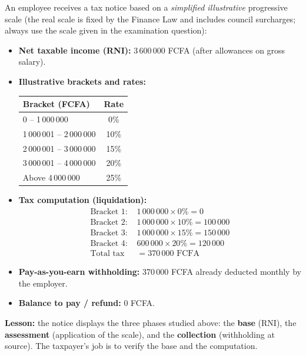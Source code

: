 \documentclass[11pt]{article}
\begin{document}
\begin{experience}
An employee receives a tax notice based on a \emph{simplified illustrative} progressive scale (the real scale is fixed by the Finance Law and includes council surcharges; always use the scale given in the examination question):
\begin{itemize}
    \item \textbf{Net taxable income (RNI):} 3\,600\,000 FCFA (after allowances on gross salary).
    \item \textbf{Illustrative brackets and rates:}
    \begin{center}
    \begin{tabular}{|l|c|}
    \hline
    \rowcolor{popblueL}
    \textbf{Bracket (FCFA)} & \textbf{Rate} \\
    \hline
    0 -- 1\,000\,000 & 0\% \\
    \hline
    1\,000\,001 -- 2\,000\,000 & 10\% \\
    \hline
    2\,000\,001 -- 3\,000\,000 & 15\% \\
    \hline
    3\,000\,001 -- 4\,000\,000 & 20\% \\
    \hline
    Above 4\,000\,000 & 25\% \\
    \hline
    \end{tabular}
    \end{center}
    \item \textbf{Tax computation (liquidation):}
    \begin{align*}
        \text{Bracket 1: } & 1\,000\,000 \times 0\% = 0 \\
        \text{Bracket 2: } & 1\,000\,000 \times 10\% = 100\,000 \\
        \text{Bracket 3: } & 1\,000\,000 \times 15\% = 150\,000 \\
        \text{Bracket 4: } & 600\,000 \times 20\% = 120\,000 \\
        \text{Total tax} & = 370\,000 \text{ FCFA}
    \end{align*}
    \item \textbf{Pay-as-you-earn withholding:} 370\,000 FCFA already deducted monthly by the employer.
    \item \textbf{Balance to pay / refund:} 0 FCFA.
\end{itemize}
\textbf{Lesson:} the notice displays the three phases studied above: the \textbf{base} (RNI), the \textbf{assessment} (application of the scale), and the \textbf{collection} (withholding at source). The taxpayer's job is to verify the base and the computation.
\end{experience}
\end{document}
